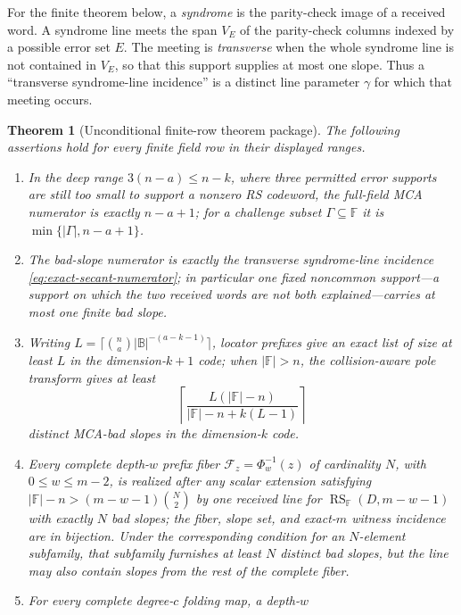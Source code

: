 \documentclass[12pt,a4paper]{amsart}
\numberwithin{equation}{section}
\newtheorem{theorem}{Theorem}[section]
\theoremstyle{remark}
\DeclareMathOperator{\RS}{RS}
\newcommand{\F}{\mathbb F}
\newcommand{\B}{\mathbb B}
\newcommand{\Fcal}{\mathcal F}
\newcommand{\abs}[1]{\lvert #1\rvert}
\begin{document}
For the finite theorem below, a \emph{syndrome} is the parity-check image
of a received word.  A syndrome line meets the span \(V_E\) of the
parity-check columns indexed by a possible error set \(E\).  The meeting is
\emph{transverse} when the whole syndrome line is not contained in
\(V_E\), so that this support supplies at most one slope.  Thus a
``transverse syndrome-line incidence'' is a distinct line parameter
\(\gamma\) for which that meeting occurs.

\begin{theorem}[Unconditional finite-row theorem package]
\label{thm:main-unconditional}
The following assertions hold for every finite field row in their displayed
ranges.
\begin{enumerate}[label=\textup{(\roman*)},leftmargin=*]
\item In the \emph{deep range} \(3(n-a)\le n-k\), where three permitted
      error supports are still too small to support a nonzero RS codeword,
      the full-field MCA numerator is
      exactly \(n-a+1\); for a challenge subset \(\Gamma\subseteq\F\) it is
      \(\min\{\abs\Gamma,n-a+1\}\).
\item The bad-slope numerator is exactly the transverse syndrome-line
      incidence \eqref{eq:exact-secant-numerator}; in particular one fixed
      \emph{noncommon support}---a support on which the two received words
      are not both explained---carries at most one finite bad slope.
\item Writing
      \(L=\lceil\binom na\abs\B^{-(a-k-1)}\rceil\), locator prefixes give
      an exact list of size at least \(L\) in the dimension-\(k+1\)
      code; when \(\abs\F>n\), the collision-aware pole transform gives at least
      \[
      \left\lceil\frac{L(\abs\F-n)}{\abs\F-n+k(L-1)}\right\rceil
      \]
      distinct MCA-bad slopes in the dimension-\(k\) code.
\item Every complete depth-\(w\) prefix fiber
      \(\Fcal_z=\Phi_w^{-1}(z)\) of cardinality \(N\), with
      \(0\le w\le m-2\), is realized after any scalar extension satisfying
      \(\abs\F-n>(m-w-1)\binom N2\) by one received line for
      \(\RS_\F(D,m-w-1)\) with exactly \(N\) bad slopes; the fiber, slope
      set, and exact-\(m\) witness incidence are in bijection.  Under the
      corresponding condition for an \(N\)-element subfamily, that
      subfamily furnishes at least \(N\) distinct bad slopes, but the line
      may also contain slopes from the rest of the complete fiber.
\item For every complete degree-\(c\) folding map, a depth-\(w\)

\end{enumerate}
\end{theorem}
\end{document}
